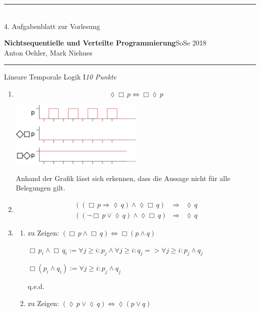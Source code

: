 \documentclass[a4paper,twoside,12pt]{article}
\newcommand{\ZETTELNUMMER}{4}
\newcounter{AUFGNR}
\newcommand{\AUFGABE}[2]{\vspace{0.3cm}\item[Aufgabe~\arabic{AUFGNR}]\stepcounter{AUFGNR} #1\hfill\emph{#2}}
\begin{document}
\pagestyle{empty}
\hrule\medskip
\rule{0ex}{0ex}\\[-1ex]
\ZETTELNUMMER. Aufgabenblatt zur Vorlesung

\smallskip
\noindent
\large
\textbf{Nichtsequentielle und Verteilte Programmierung}\hfill SoSe
2018 \\[0.5ex]
\normalsize
Anton Oehler, Mark Niehues

\newcommand{\immer}{\Box}
\newcommand{\irgendwann}{\lozenge}
\newcommand{\folgt}{\Rightarrow}
\newcommand{\oder}{\vee}
\newcommand{\und}{\wedge}

\medskip\hrule

\begin{description}
\AUFGABE{Lineare Temporale Logik I}{10 Punkte}
\begin{enumerate}
  \item { \[
     \lozenge \Box\, p \Leftrightarrow \Box \lozenge\, p
  \]}
  
  \includegraphics[width=0.5\textwidth]{1_a.png}
  
Anhand der Grafik lässt sich erkennen, dass die Aussage nicht für alle Belegungen gilt.

  \item \begin{eqnarray}
		     ((\Box\, p \Rightarrow \lozenge\, q) \land \lozenge \Box\, q )& \Rightarrow & \lozenge\, q \\
		     ((\neg \Box\, p \lor \lozenge\, q) \land \lozenge \Box\, q )& \Rightarrow & \lozenge\, q
		\end{eqnarray}

\item 
\begin{enumerate}
\item zu Zeigen: $(\Box\, p \wedge \Box\, q) \Leftrightarrow \Box (p \wedge q)$

$
\Box\, p_i \wedge \Box\, q_i := \forall j \geq i : p_j \wedge \forall j \geq i:q_j => \forall j \geq i: p_j \wedge q_j
$

$
\Box (p_i \wedge q_i) := \forall j \geq i: p_j \wedge q_j
$ 

q.e.d.

\item zu Zeigen: $(\lozenge\, p \vee \lozenge\, q) \Leftrightarrow \lozenge (p \vee q)$


\end{enumerate}
\end{enumerate}
\end{description}
\end{document}
